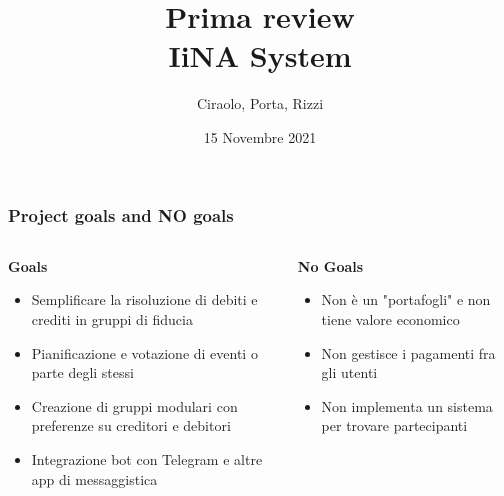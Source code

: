 \documentclass[11pt]{beamer}
\date{15 Novembre 2021}
\begin{document}
	\author{Ciraolo, Porta, Rizzi}
	\title[IiNA System]{Prima review\\IiNA System}
	\begin{frame}[plain]
		\maketitle
	\end{frame}
	
	\begin{frame}
		\frametitle{Project goals and NO goals}
		
		\begin{columns}
			\begin{column}{.45\linewidth}
				\begin{center}
					\textbf{Goals}
				\end{center}
				\begin{itemize}
					\item Semplificare la risoluzione di debiti e crediti in gruppi di fiducia
					\item Pianificazione e votazione di eventi o parte degli stessi
					\item Creazione di gruppi modulari con preferenze su creditori e debitori
					\item Integrazione bot con Telegram e altre app di messaggistica
				\end{itemize}
			\end{column}
			\begin{column}{.45\linewidth}
				\begin{center}
					\textbf{No Goals}
				\end{center}
				\begin{itemize}
					\item Non è un "portafogli" e non tiene valore economico
					\item Non gestisce i pagamenti fra gli utenti%
					\item Non implementa un sistema per trovare partecipanti
				\end{itemize}
			\end{column}
		\end{columns}
	\end{frame}
\end{document}
